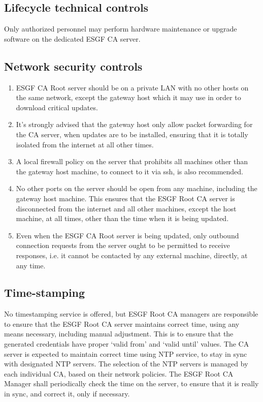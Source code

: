 \subsection{Lifecycle technical controls}\label{life-cycle-technical-controls}

Only authorized personnel may perform hardware maintenance or upgrade software on the dedicated ESGF CA server.

\subsection{Network security controls}\label{network-security-controls}
\begin{enumerate}
\item ESGF CA Root server should be on a private LAN with no other hosts on the same network, except the gateway host which it may use in order to download critical updates. 
\item It's strongly advised that the gateway host only allow packet forwarding for the CA server, when updates are to be installed, ensuring that it is totally isolated from the internet at all other times. 
\item A local firewall policy on the server that prohibits all machines other than the gateway host machine, to connect to it via ssh, is also recommended. 
\item No other ports on the server should be open from any machine, including the gateway host machine. This ensures that the ESGF Root CA server is disconnected from the internet and all other machines, except the host machine, at all times, other than the time when it is being updated.
\item Even when the ESGF CA Root server is being updated, only outbound connection requests from the server ought to be  permitted to receive responses, i.e. it cannot be contacted by any external machine, directly, at any time.
\end{enumerate}

\subsection{Time-stamping}\label{time-stamping}

No timestamping service is offered, but ESGF Root CA managers are responsible to ensure that the ESGF Root CA server maintains correct time, using any means necessary, including manual adjustment. This is to ensure that the generated credentials have proper `valid from' and `valid until' values.
The CA server is expected to maintain correct time using NTP service, to stay in sync with designated NTP servers. The selection of the NTP servers is managed by each individual CA, based on their network policies. The ESGF Root CA Manager shall periodically check the time on the server, to ensure that it is really in sync, and correct it, only if necessary.

